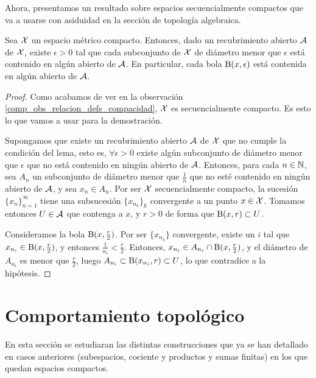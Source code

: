 Ahora, presentamos un resultado sobre espacios secuencialmente compactos que va a usarse con asiduidad en la sección de topología algebraica.

\begin{lem}[Lebesgue]
	\label{comp_lema_lebesgue}
	Sea $\mathcal{X}$ un espacio métrico compacto. Entonces, dado un recubrimiento abierto $\mathcal{A}$ de $\mathcal{X}$, existe $\epsilon>0$ tal que cada subconjunto de $\mathcal{X}$ de diámetro menor que $\epsilon$ está contenido en algún abierto de $\mathcal{A}$. En particular, cada bola $\operatorname{B}(x,\epsilon)$ está contenida en algún abierto de $\mathcal{A}$.

	\begin{proof}
		Como acabamos de ver en la observación \ref{comp_obs_relacion_defs_compacidad}, $\mathcal{X}$ es secuencialmente compacto. Es esto lo que vamos a usar para la demostración.
	
		Supongamos que existe un recubrimiento abierto $\mathcal{A}$ de $\mathcal{X}$ que no cumple la condición del lema, esto es, $\forall\epsilon > 0$ existe algún subconjunto de diámetro menor que $\epsilon$ que no está contenido en ningún abierto de $\mathcal{A}$. Entonces, para cada $n\in\mathbb{N}$, sea $A_n$ un subconjunto de diámetro menor que $\frac{1}{n}$ que no esté contenido en ningún abierto de $\mathcal{A}$, y sea $x_n\in A_n$. Por ser $\mathcal{X}$ secuencialmente compacto, la sucesión $\{x_n\}_{n=1}^\infty$ tiene una subsucesión $\{x_{n_k}\}_k$ convergente a un punto $x\in\mathcal{X}$. Tomamos entonces $U\in\mathcal{A}$ que contenga a $x$, y $r>0$ de forma que $\operatorname{B}(x,r)\subset U$.

		Consideramos la bola $\operatorname{B}(x,\frac{r}{2})$. Por ser $\{x_{n_k}\}$ convergente, existe un $i$ tal que $x_{n_i}\in\operatorname{B}(x,\frac{r}{2})$, y entonces $\frac{1}{n_i}<\frac{r}{2}$. Entonces, $x_{n_i}\in A_{n_i}\cap\operatorname{B}(x,\frac{r}{2})$, y el diámetro de $A_{n_i}$ es menor que $\frac{r}{2}$, luego $A_{n_i}\subset\operatorname{B}(x_{n_i},r)\subset U$, lo que contradice a la hipótesis.
	\end{proof}
\end{lem}


\section{Comportamiento topológico}

En esta sección se estudiaran las distintas construcciones que ya se han detallado en casos anteriores (subespacios, cociente y productos y sumas finitas) en los que quedan espacios compactos. 

